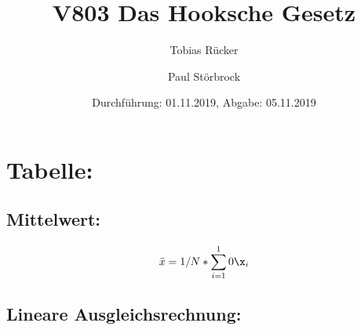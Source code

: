 

\title{V803 Das Hooksche Gesetz}
\author{Tobias Rücker \and Paul Störbrock}
\date{Durchführung: 01.11.2019, Abgabe: 05.11.2019}


\maketitle


\newpage
\section{Tabelle:}   
\begin{table}
    \centering
    \label{tab:data}
       
\end{table}
    \subsection{Mittelwert:}
    \begin{equation}
        \bar{x} = 1/N*\sum\limits_{i=1}^10{\x_i}
    \end{equation}

    \subsection{Lineare Ausgleichsrechnung:}
